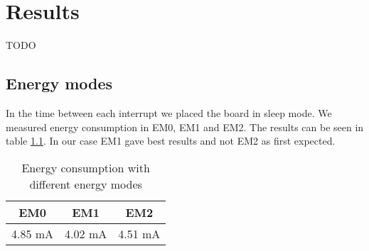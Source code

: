 \chapter{Results}
TODO

\section{Energy modes}
In the time between each interrupt we placed the board in sleep mode. We measured energy consumption in EM0, EM1 and EM2. The results can be seen in table \ref{tab:benchmarkEnergyModes}. In our case EM1 gave best results and not EM2 as first expected.

\begin{table}[ht]
	\begin{center}
	\begin{tabular}{ |c|c|c| }
	  \hline
	  EM0 & EM1 & EM2 \\
	  \hline
	  4.85 mA & 4.02 mA & 4.51 mA \\
	  \hline

	\end{tabular}
	\caption{Energy consumption with different energy modes}
	\label{tab:benchmarkEnergyModes}
	\end{center}
\end{table}
